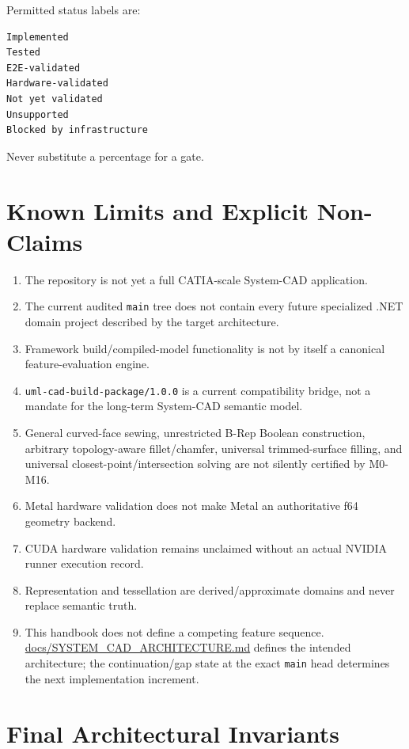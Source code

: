 \documentclass[11pt,a4paper]{report}
\newcommand{\pathref}[1]{\url{#1}}
\begin{document}
Permitted status labels are:

\begin{lstlisting}
Implemented
Tested
E2E-validated
Hardware-validated
Not yet validated
Unsupported
Blocked by infrastructure
\end{lstlisting}

Never substitute a percentage for a gate.

\chapter{Known Limits and Explicit Non-Claims}

\begin{enumerate}
\item The repository is not yet a full CATIA-scale System-CAD application.
\item The current audited \texttt{main} tree does not contain every future specialized .NET domain project described by the target architecture.
\item Framework build/compiled-model functionality is not by itself a canonical feature-evaluation engine.
\item \texttt{uml-cad-build-package/1.0.0} is a current compatibility bridge, not a mandate for the long-term System-CAD semantic model.
\item General curved-face sewing, unrestricted B-Rep Boolean construction, arbitrary topology-aware fillet/chamfer, universal trimmed-surface filling, and universal closest-point/intersection solving are not silently certified by M0-M16.
\item Metal hardware validation does not make Metal an authoritative f64 geometry backend.
\item CUDA hardware validation remains unclaimed without an actual NVIDIA runner execution record.
\item Representation and tessellation are derived/approximate domains and never replace semantic truth.
\item This handbook does not define a competing feature sequence. \pathref{docs/SYSTEM_CAD_ARCHITECTURE.md} defines the intended architecture; the continuation/gap state at the exact \texttt{main} head determines the next implementation increment.
\end{enumerate}

\chapter{Final Architectural Invariants}
\end{document}
